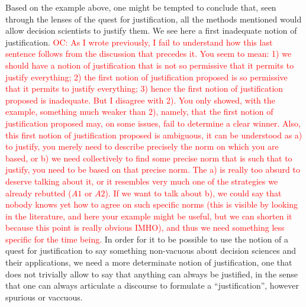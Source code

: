 \documentclass[preprint, french, english, 11pt, authoryear]{elsarticle}%
\newcommand{\commentOC}[1]{\textcolor{red}{OC: #1}}
\begin{document}
Based on the example above, one might be tempted to conclude that, seen through the lenses of the quest for justification, all the methods mentioned would allow decision scientists to justify them. We see here a first inadequate notion of justification. 
\commentOC{As I wrote previously, I fail to understand how this last sentence follows from the discussion that precedes it. You seem to mean: 1) we should have a notion of justification that is not so permissive that it permits to justify everything; 2) the first notion of justification proposed is so permissive that it permits to justify everything; 3) hence the first notion of justification proposed is inadequate. But I disagree with 2). You only showed, with the example, something much weaker than 2), namely, that the first notion of justification proposed may, on some issues, fail to determine a clear winner. Also, this first notion of justification proposed is ambiguous, it can be understood as a) to justify, you merely need to describe precisely the norm on which you are based, or b) we need collectively to find some precise norm that is such that to justify, you need to be based on that precise norm. The a) is really too absurd to deserve talking about it, or it resembles very much one of the strategies we already rebutted ($A1$ or $A2$). If we want to talk about b), we could say that nobody knows yet how to agree on such specific norms (this is visible by looking in the literature, and here your example might be useful, but we can shorten it because this point is really obvious IMHO), and thus we need something less specific for the time being.}
In order for it to be possible to use the notion of a quest for justification to say something non-vacuous about decision sciences and their applications, we need a more determinate notion of justification, one that does not trivially allow to say that anything can always be justified, in the sense that one can always articulate a discourse to formulate a ``justification'', however spurious or vaccuous.
\end{document}

